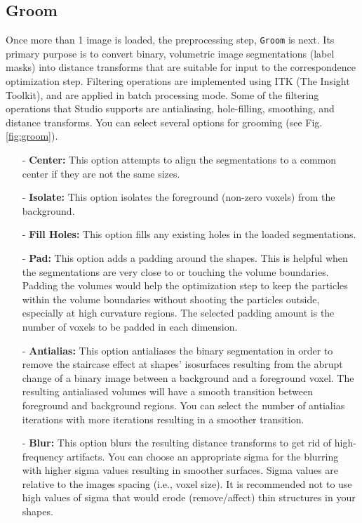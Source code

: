 \documentclass[letterpaper,12pt]{article}   %
\begin{document}
\subsection{Groom}

Once more than 1 image is loaded, the preprocessing step, \texttt{Groom} is next. Its primary purpose is to convert binary, volumetric image segmentations (label masks) into distance transforms that are suitable for input to the correspondence optimization step. Filtering operations are implemented using ITK (The Insight Toolkit), and are applied in batch processing mode. Some of the filtering operations that Studio supports are antialiasing, hole-filling, smoothing, and distance transforms. You can select several options for grooming (see Fig. \ref{fig:groom}).

\begin{itemize}
\item[-] \textbf{Center:} This option attempts to align the segmentations to a common center if they are not the same sizes.
\item[-] \textbf{Isolate:} This option isolates the foreground (non-zero voxels) from the background.
\item[-] \textbf{Fill Holes:} This option fills any existing holes in the loaded segmentations.
\item[-] \textbf{Pad:} This option adds a padding around the shapes. This is helpful when the segmentations are very close to or touching the volume boundaries. Padding the volumes would help the optimization step to keep the particles within the volume boundaries without shooting the particles outside, especially at high curvature regions. The selected padding amount is the number of voxels to be padded in each dimension.
\item[-] \textbf{Antialias:} This option antialiases the binary segmentation in order to remove the staircase effect at shapes' isosurfaces resulting from the abrupt change of a binary image between a background and a foreground voxel. The resulting antialiased volumes will have a smooth transition between foreground and background regions. You can select the number of antialias iterations with more iterations resulting in a smoother transition.
\item[-] \textbf{Blur:} This option blurs the resulting distance transforms to get rid of high-frequency artifacts. You can choose an appropriate sigma for the blurring with higher sigma values resulting in smoother surfaces. Sigma values are relative to the images spacing (i.e., voxel size). It is recommended not to use high values of sigma that would erode (remove/affect) thin structures in your shapes.

\end{itemize}
\end{document}
